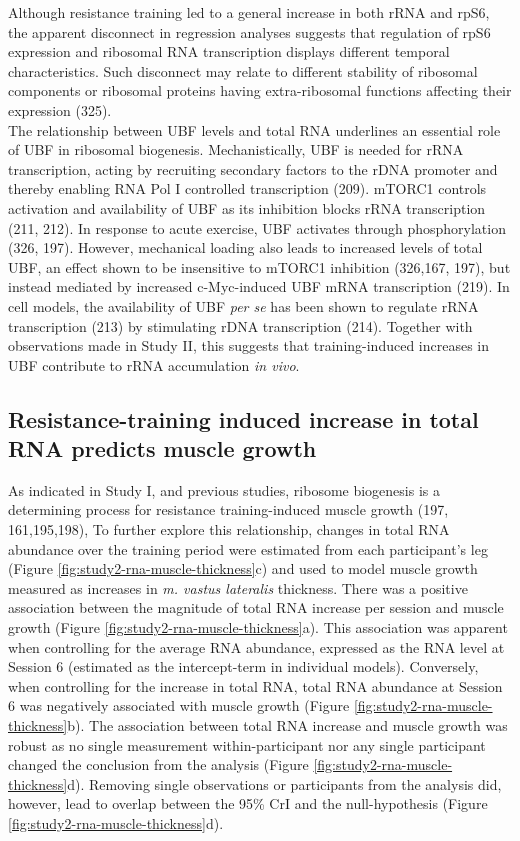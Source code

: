 \documentclass[twoside,10pt]{gihclass} %
\begin{document}
Although resistance training led to a general increase in both rRNA and rpS6, the apparent disconnect in regression analyses suggests that regulation of rpS6 expression and ribosomal RNA transcription displays different temporal characteristics. Such disconnect may relate to different stability of ribosomal components or ribosomal proteins having extra-ribosomal functions affecting their expression
(325).\\
The relationship between UBF levels and total RNA underlines an essential role of UBF in ribosomal biogenesis. Mechanistically, UBF is needed for rRNA transcription, acting by recruiting secondary factors to the rDNA promoter and thereby enabling RNA Pol I controlled transcription
(209).
mTORC1 controls activation and availability of UBF as its inhibition blocks rRNA transcription
(211, 212).
In response to acute exercise, UBF activates through phosphorylation
(326, 197).
However, mechanical loading also leads to increased levels of total UBF, an effect shown to be insensitive to mTORC1 inhibition
(326,167, 197),
but instead mediated by increased c-Myc-induced UBF mRNA transcription (219).
In cell models, the availability of UBF \emph{per se} has been shown to regulate rRNA transcription
(213) by stimulating rDNA transcription
(214).
Together with observations made in Study II, this suggests that training-induced increases in UBF contribute to rRNA accumulation \emph{in vivo}.

\hypertarget{resistance-training-induced-increase-in-total-rna-predicts-muscle-growth}{%
\subsection{Resistance-training induced increase in total RNA predicts muscle growth}\label{resistance-training-induced-increase-in-total-rna-predicts-muscle-growth}}

As indicated in Study I, and previous studies, ribosome biogenesis is a determining process for resistance training-induced muscle growth
(197, 161,195,198),
To further explore this relationship, changes in total RNA abundance over the training period were estimated from each participant's leg (Figure \ref{fig:study2-rna-muscle-thickness}c) and used to model muscle growth measured as increases in \emph{m. vastus lateralis} thickness. There was a positive association between the magnitude of total RNA increase per session and muscle growth (Figure \ref{fig:study2-rna-muscle-thickness}a). This association was apparent when controlling for the average RNA abundance, expressed as the RNA level at Session 6 (estimated as the intercept-term in individual models). Conversely, when controlling for the increase in total RNA, total RNA abundance at Session 6 was negatively associated with muscle growth (Figure \ref{fig:study2-rna-muscle-thickness}b).
The association between total RNA increase and muscle growth was robust as no single measurement within-participant nor any single participant changed the conclusion from the analysis (Figure \ref{fig:study2-rna-muscle-thickness}d). Removing single observations or participants from the analysis did, however, lead to overlap between the 95\% CrI and the null-hypothesis (Figure \ref{fig:study2-rna-muscle-thickness}d).
\end{document}

